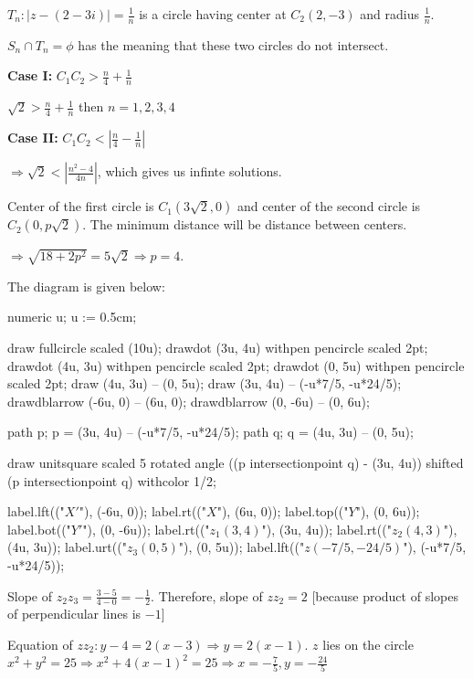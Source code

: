   $T_n: |z - (2 - 3i)| = \frac{1}{n}$ is a circle having center at $C_2(2, -3)$ and radius $\frac{1}{n}$.

  $S_n\cap T_n = \phi$ has the meaning that these two circles do not intersect.

  {\bf Case I:} $C_1C_2 > \frac{n}{4} + \frac{1}{n}$

  $\sqrt{2} > \frac{n}{4} + \frac{1}{n}$ then $n = 1, 2, 3, 4$

  {\bf Case II:} $C_1C_2 < \left|\frac{n}{4} - \frac{1}{n}\right|$

  $\Rightarrow \sqrt{2} <\left|\frac{n^2 - 4}{4n}\right|$, which gives us infinte solutions.
\item Center of the first circle is $C_1(3\sqrt{2}, 0)$ and center of the second circle is $C_2(0,
  p\sqrt{2})$. The minimum distance will be distance between centers.

  $\Rightarrow \sqrt{18 + 2p^2} = 5\sqrt{2}\Rightarrow p = 4$.
\item The diagram is given below:

  \startplacefigure[location=force]
    \startMPcode
      numeric u;
      u := 0.5cm;

      draw fullcircle scaled (10u);
      drawdot (3u, 4u) withpen pencircle scaled 2pt;
      drawdot (4u, 3u) withpen pencircle scaled 2pt;
      drawdot (0, 5u) withpen pencircle scaled 2pt;
      draw (4u, 3u) -- (0, 5u);
      draw (3u, 4u) -- (-u*7/5, -u*24/5);
      drawdblarrow (-6u, 0) -- (6u, 0);
      drawdblarrow (0, -6u) -- (0, 6u);

      path p;
      p = (3u, 4u) -- (-u*7/5, -u*24/5);
      path q;
      q = (4u, 3u) -- (0, 5u);

      draw unitsquare scaled 5 rotated angle ((p intersectionpoint q) - (3u, 4u))
      shifted (p intersectionpoint q) withcolor 1/2;

      label.lft(("$X'$"), (-6u, 0));
      label.rt(("$X$"), (6u, 0));
      label.top(("$Y$"), (0, 6u));
      label.bot(("$Y'$"), (0, -6u));
      label.rt(("$z_1(3, 4)$"), (3u, 4u));
      label.rt(("$z_2(4, 3)$"), (4u, 3u));
      label.urt(("$z_3(0, 5)$"), (0, 5u));
      label.lft(("$z(-7/5, -24/5)$"), (-u*7/5, -u*24/5));
    \stopMPcode
  \stopplacefigure

  Slope of $z_2z_3 = \frac{3 - 5}{4 - 0} = -\frac{1}{2}$. Therefore, slope of $zz_2 = 2$ [because product of
    slopes of perpendicular lines is $-1$]

  Equation of $zz_2: y - 4 = 2(x - 3)\Rightarrow y = 2(x - 1)$. $z$ lies on the circle $x^2 + y^2 = 25
  \Rightarrow x^2 + 4(x - 1)^2 = 25 \Rightarrow x = -\frac{7}{5}, y = -\frac{24}{5}$

